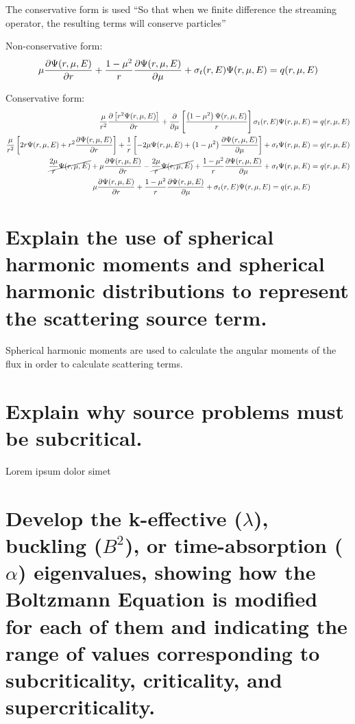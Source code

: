 \documentclass{article}
\begin{document}
The conservative form is used ``So that when we finite difference the streaming operator, the resulting terms will conserve particles''

Non-conservative form:
\begin{align*}
	\mu \pdv{\Psi (r, \mu, E)}{r} + \frac{1-\mu^2}{r} \pdv{\Psi (r, \mu, E)}{\mu} +\sigma_t(r, E) \Psi (r, \mu, E) = q(r, \mu, E)
\end{align*}

Conservative form:
\begin{align*}
	\frac{\mu}{r^2} \pdv{\left[ r^2 \Psi(r, \mu, E) \right]}{r} + \pdv{}{\mu} \left[ \frac{\left( 1 - \mu^2 \right) \Psi(r, \mu, E)}{r} \right]
		\sigma_t (r, E) \Psi ( r, \mu, E ) &= q(r, \mu, E) \\
	\frac{\mu}{r^2} \left[ 2 r \Psi ( r, \mu, E ) + r^2 \pdv{\Psi ( r, \mu, E )}{r} \right] + 
		\frac{1}{r} \left[ -2 \mu \Psi ( r, \mu, E ) + \left( 1 - \mu^2 \right) \pdv{\Psi ( r, \mu, E )}{\mu} \right] + 
		\sigma_t \Psi ( r, \mu, E ) &= q(r, \mu, E) \\
	\cancel{\frac{2 \mu}{r} \Psi ( r, \mu, E )} + \mu \pdv{\Psi ( r, \mu, E )}{r} - \cancel{\frac{2 \mu}{r} \Psi ( r, \mu, E )} +
		\frac{1 - \mu^2}{r} \pdv{\Psi ( r, \mu, E )}{\mu} + \sigma_t \Psi ( r, \mu, E ) &= q(r, \mu, E) \\
	\mu \pdv{\Psi (r, \mu, E)}{r} + \frac{1-\mu^2}{r} \pdv{\Psi (r, \mu, E)}{\mu} +\sigma_t(r, E) \Psi (r, \mu, E) = q(r, \mu, E)
\end{align*}

\newpage
\section{Explain the use of spherical harmonic moments and spherical harmonic distributions to represent the scattering source term.}

Spherical harmonic moments are used to calculate the angular moments of the flux in order to calculate scattering terms.

\newpage
\section{Explain why source problems must be subcritical.}

Lorem ipsum dolor simet

\newpage
\section{Develop the k-effective ($\lambda$), buckling ($B^2$), or time-absorption ($\alpha$) eigenvalues, showing how the Boltzmann Equation is modified for each of them and indicating the range of values corresponding to subcriticality, criticality, and supercriticality.}
\end{document}
